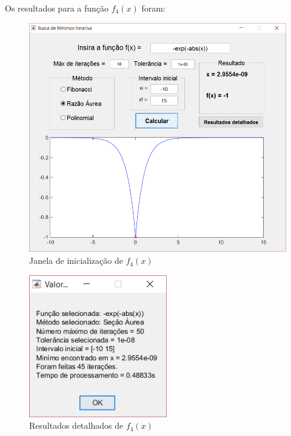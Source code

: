 Os resultados para a função $ f_4(x) $ foram:

\begin{figure}[h]
	\begin{center}
		\includegraphics[width=13cm]{../aurea/f4_gui.png}   
		\caption{Janela de inicialização de $ f_4(x) $}
		\label{fig:fibonacci-f4-gui}
	\end{center}
\end{figure}

\begin{figure}[h!]
	\begin{center}
		\includegraphics[width=6cm]{../aurea/f4_resultados.png}   
		\caption{Resultados detalhados de $ f_4(x) $}
		\label{fig:fibonacci-f4-resultados}
	\end{center}
\end{figure}
